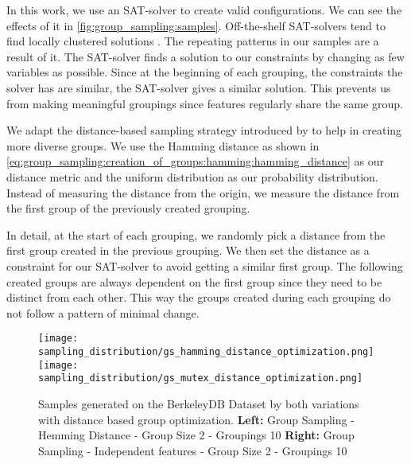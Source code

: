 \documentclass[../../thesis.tex]{subfiles}
\begin{document}
In this work, we use an SAT-solver to create valid configurations.
We can see the effects of it in \autoref{fig:group_sampling:samples}.
Off-the-shelf SAT-solvers tend to find locally clustered solutions \cite{kaltenecker2019distance}.
The repeating patterns in our samples are a result of it. The SAT-solver finds a solution
to our constraints by changing as few variables as possible.
Since at the beginning of each grouping, the constraints the solver has are similar,
the SAT-solver gives a similar solution. This prevents us from making meaningful groupings since
features regularly share the same group.

We adapt the distance-based sampling strategy introduced by \citet{kaltenecker2019distance} to
help in creating more diverse groups. We use the Hamming distance as shown in \autoref{eq:group_sampling:creation_of_groups:hamming:hamming_distance}
as our distance metric and the uniform distribution as our probability distribution.
Instead of measuring the distance from the origin, we measure the distance from the first group of the
previously created grouping.

In detail, at the start of each grouping, we randomly pick a distance from the first group created
in the previous grouping. We then set the distance as a constraint for our SAT-solver to avoid 
getting a similar first group. The following created groups are always dependent on the first group 
since they need to be distinct from each other. This way the groups created during each grouping do
not follow a pattern of minimal change.



\begin{figure}[htp]
  \begin{center}
    \texttt{[image: sampling\_distribution/gs\_hamming\_distance\_optimization.png]}
    \texttt{[image: sampling\_distribution/gs\_mutex\_distance\_optimization.png]}
  \end{center}

  \caption[Group Sampling - Samples - Optimized]{
    Samples generated on the BerkeleyDB Dataset by both variations with distance based group optimization.
    \textbf{Left:}  Group Sampling - Hemming Distance - Group Size 2 - Groupings 10
    \textbf{Right:} Group Sampling - Independent features - Group Size 2 - Groupings 10
  }\label{fig:a}
\end{figure}
\end{document}

